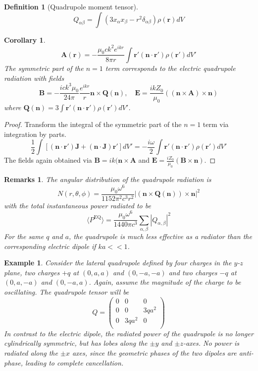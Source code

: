 \documentclass[a4paper]{article}
\newtheorem{remarks}{Remarks}[section]
\newtheorem{eg}{Example}[section]
\theoremstyle{new}
\newtheorem{defi}{Definition}[section]
\newtheorem{cor}{Corollary}[section]
\begin{document}
\begin{defi}[Quadrupole moment tensor]
$$Q_{\alpha\beta}=\int(3x_\alpha x_\beta -r^2\delta_{\alpha\beta})\rho(\mathbf{r})dV$$
\end{defi}
\begin{cor}
$$\mathbf{A}(\mathbf{r})=-\frac{\mu_0ck^2e^{ikr}}{8\pi r}\int\mathbf{r'}(\mathbf{n}\cdot\mathbf{r'})\rho(\mathbf{r'})dV'$$
The symmetric part of the $n=1$ term corresponds to the electric quadrupole radiation with fields
$$\mathbf{B}=-\frac{ick^3\mu_0}{24\pi}\frac{e^{ikr}}{r}\mathbf{n}\times\mathbf{Q}(\mathbf{n}),\quad\mathbf{E}=\frac{ikZ_0}{\mu_0}((\mathbf{n}\times\mathbf{A})\times\mathbf{n})$$
where $\mathbf{Q}(\mathbf{n})=3\int\mathbf{r'}(\mathbf{n}\cdot\mathbf{r'})\rho(\mathbf{r'})dV'$.
\end{cor}
\begin{proof}
Transform the integral of the symmetric part of the $n=1$ term via integration by parts.
$$\frac{1}{2}\int[(\mathbf{n}\cdot\mathbf{r'})\mathbf{J}+(\mathbf{n}\cdot\mathbf{J})\mathbf{r'}]dV'=-\frac{i\omega}{2}\int\mathbf{r'}(\mathbf{n}\cdot\mathbf{r'})\rho(\mathbf{r'})dV'$$
The fields again obtained via $\mathbf{B}=ik(\mathbf{n}\times\mathbf{A}$ and $\mathbf{E}=\frac{iZ_0}{\mu_0}(\mathbf{B}\times\mathbf{n})$.
\end{proof}
\begin{remarks}
The angular distribution of the quadrupole radiation is
$$N(r,\theta,\phi)=\frac{\mu_0\omega^6}{1152\pi^2c^3r^2}|(\mathbf{n}\times\mathbf{Q}(\mathbf{n}))\times\mathbf{n}|^2$$
with the total instantaneous power radiated to be
$$\langle P^{\text{EQ}}\rangle=\frac{\mu_0\omega^6}{1440\pi c^3}\sum_{\alpha,\beta}|Q_{\alpha,\beta}|^2$$
For the same $q$ and $a$, the quadrupole is much less effective as a radiator than the corresponding electric dipole if $ka<<1$. 
\end{remarks}
\begin{eg}
Consider the lateral quadrupole defined by four charges in the $y$-$z$ plane, two charges $+q$ at $(0,a,a)$ and $(0,-a,-a)$ and two charges $-q$ at $(0,a,-a)$ and $(0,-a,a)$. Again, assume the magnitude of the charge to be oscillating. The quadrupole tensor will be
$$Q=\begin{pmatrix}0&0&0\\0&0&3qa^2\\0&3qa^2&0\\\end{pmatrix}$$
In contrast to the electric dipole, the radiated power of the quadrupole is no longer cylindrically symmetric, but has lobes along the $\pm y$ and $\pm z$-axes. No power is radiated along the $\pm x$ axes, since the geometric phases of the two dipoles are anti-phase, leading to complete cancellation.
\end{eg}
\newpage
\end{document}
